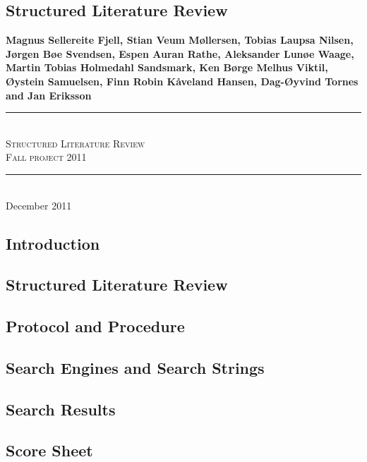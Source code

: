 \appendix
\begin{refsegment}

\chapter{Structured Literature Review}
\label{appendix:slrreport}

\newcommand{\slrTitle}{Structured Literature Review}
\newcommand{\slrSubtitle}{Fall project 2011}
\newcommand{\slrMadeby}{Magnus Sellereite Fjell, Stian Veum M{\o}llersen, Tobias Laupsa Nilsen, J{\o}rgen B{\o}e Svendsen, Espen Auran Rathe, Aleksander Lun{\o}e Waage, Martin Tobias Holmedahl Sandsmark, Ken B{\o}rge Melhus Viktil, {\O}ystein Samuelsen, Finn Robin K{\aa}veland Hansen, Dag-{\O}yvind Tornes and Jan Eriksson}
\newcommand{\slrDate}{December 2011}
\newcommand{\Hline}{\rule{\linewidth}{0.3mm} \\}

\begin{center}
\large \textbf{\slrMadeby}

\vspace{3cm}
\Hline
\Huge \textsc{\slrTitle}
\vspace{2cm}
\huge \\ \textsc{\slrSubtitle}
\Hline
\vfill
\normalsize \slrDate
\end{center}

\section{Introduction}


\section{Structured Literature Review}


\section{Protocol and Procedure}


\section{Search Engines and Search Strings}


\section{Search Results}


\section{Score Sheet}


\clearpage

\end{refsegment}

\cleardoublepage
{}
\pagestyle{plain}
\printbibliography[segment=1, title=Structured Literature Review - Bibliography]
